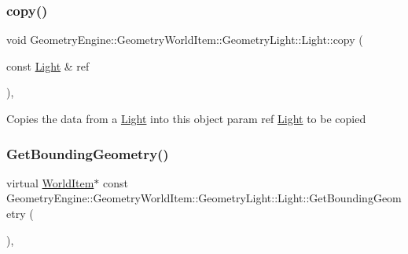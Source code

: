 \mbox{\label{class_geometry_engine_1_1_geometry_world_item_1_1_geometry_light_1_1_light_ae3f695bb7e3d4fd3a02bdffaddd07c1a}} 
\subsubsection{\texorpdfstring{copy()}{copy()}}
{\footnotesize\ttfamily void Geometry\+Engine\+::\+Geometry\+World\+Item\+::\+Geometry\+Light\+::\+Light\+::copy (\begin{DoxyParamCaption}\item[{const \mbox{\hyperlink{class_geometry_engine_1_1_geometry_world_item_1_1_geometry_light_1_1_light}{Light}} \&}]{ref }\end{DoxyParamCaption})\hspace{0.3cm}{\ttfamily [protected]}, {\ttfamily [virtual]}}

Copies the data from a \mbox{\hyperlink{class_geometry_engine_1_1_geometry_world_item_1_1_geometry_light_1_1_light}{Light}} into this object param ref \mbox{\hyperlink{class_geometry_engine_1_1_geometry_world_item_1_1_geometry_light_1_1_light}{Light}} to be copied \mbox{\label{class_geometry_engine_1_1_geometry_world_item_1_1_geometry_light_1_1_light_a53cc9a8e7ab6eab9d34f1655ef33eaef}} 
\subsubsection{\texorpdfstring{GetBoundingGeometry()}{GetBoundingGeometry()}}
{\footnotesize\ttfamily virtual \mbox{\hyperlink{class_geometry_engine_1_1_geometry_world_item_1_1_world_item}{World\+Item}}$\ast$ const Geometry\+Engine\+::\+Geometry\+World\+Item\+::\+Geometry\+Light\+::\+Light\+::\+Get\+Bounding\+Geometry (\begin{DoxyParamCaption}{ }\end{DoxyParamCaption})\hspace{0.3cm}{\ttfamily [inline]}, {\ttfamily [virtual]}}

